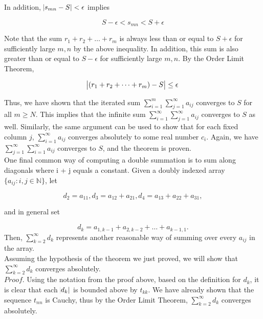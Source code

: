 \documentclass{article}
\begin{document}
In addition, $\abs{s_{mn} - S} < \epsilon$ implies 

\begin{equation}
    S - \epsilon < s_{mn} < S + \epsilon
\end{equation}

Note that the sum $r_1 + r_2 + \dots + r_m$ is always less than or equal to $S + \epsilon$ for sufficiently large $m, n$ by the above inequality. In addition, this sum is also greater than or equal to $S - \epsilon$ for sufficiently large $m, n$. By the Order Limit Theorem, 

\begin{equation}
    \abs{(r_1 + r_2 + \dots + r_m) - S} \leq \epsilon
\end{equation}

Thus, we have shown that the iterated sum $\sum_{i=1}^m \sum_{j=1}^\infty a_{ij}$ converges to $S$ for all $m \geq N$. This implies that the infinite sum  $\sum_{i=1}^\infty \sum_{j=1}^\infty a_{ij}$ converges to $S$ as well. Similarly, the same argument can be used to show that for each fixed column $j$, $\sum_{i=1}^\infty a_{ij}$ converges absolutely to some real number $c_i$. Again, we have $\sum_{j=1}^\infty \sum_{i=1}^\infty a_{ij}$ converges to $S$, and the theorem is proven. \\

One final common way of computing a double summation is to sum along
diagonals where i + j equals a constant. Given a doubly indexed array $\{a_{ij} \colon
i, j \in \mathbb{N}\}$, let 

\begin{equation*}
    d_2 = a_{11}, d_3 = a_{12} + a_{21}, d_4 = a_{13} + a_{22} + a_{31},
\end{equation*}

and in general set

\begin{equation*}
d_k = a_{1,k-1} + a_{2,k-2} + \dots + a_{k-1,1}.
\end{equation*}
Then, $\sum_{k=2}^\infty d_k$ represents another reasonable way of summing over every $a_{ij}$ in
the array. \\

Assuming the hypothesis of the theorem we just proved, we will show that $\sum_{k=2}^\infty d_k$ converges absolutely. \\

$Proof.$ Using the notation from the proof above, based on the definition for $d_k$, it is clear that each $\abs{d_k}$ is bounded above by $t_{kk}$. We have already shown that the sequence $t_{nn}$ is Cauchy, thus by the Order Limit Theorem, $\sum_{k=2}^\infty d_k$ converges absolutely. \\
\end{document}
